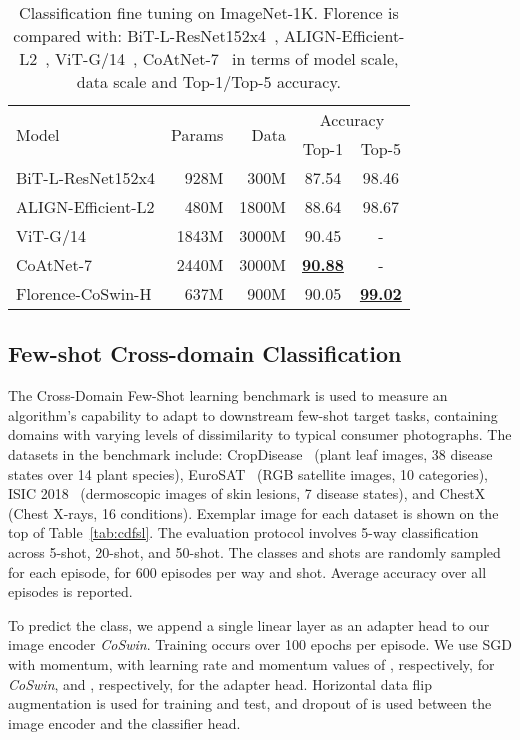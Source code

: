 \documentclass{article}
\begin{document}
\begin{table}[t]
\centering
\setlength{\tabcolsep}{6.3pt}
\small
\renewcommand{\arraystretch}{1.35}
\begin{tabular}{l|rrcc}
\toprule
\multirow{2}{*}{Model} & \multirow{2}{*}{Params} & \multirow{2}{*}{Data\;} &
\multicolumn{2}{c}{Accuracy} \\
& & & Top-1 & Top-5\\ \midrule
BiT-L-ResNet152x4 & 928M & 300M & 87.54 & 98.46  \\
ALIGN-Efficient-L2 & 480M & 1800M & 88.64 & 98.67  \\
ViT-G/14 & 1843M & 3000M & 90.45 & -  \\
CoAtNet-7 & 2440M & 3000M & \underline{\bf{90.88}} & - \\
Florence-CoSwin-H & 637M & 900M & 90.05 & \underline{\bf{99.02}}  \\ \bottomrule
\end{tabular}
\caption{Classification fine tuning on ImageNet-1K. Florence is compared with: BiT-L-ResNet152x4~\cite{kolesnikov2020big}, ALIGN-Efficient-L2~\cite{jia2021scaling}, ViT-G/14~\cite{zhai2021scaling}, CoAtNet-7~\cite{dai2021coatnet} in terms of model scale, data scale and Top-1/Top-5 accuracy.}
\label{tab:imagenet_result}
\end{table}


\subsection{Few-shot Cross-domain Classification}

The Cross-Domain Few-Shot learning benchmark \cite{cdfsl} is used to measure an algorithm's capability to adapt to downstream few-shot target tasks, containing domains with varying levels of dissimilarity to typical consumer photographs. The datasets in the benchmark include: CropDisease~\cite{plantdisease} (plant leaf images, 38 disease states over 14 plant species), EuroSAT~\cite{eurosat} (RGB satellite images, 10 categories), ISIC 2018~\cite{isic2018,ham10000} (dermoscopic images of skin lesions, 7 disease states), and ChestX~\cite{chestx} (Chest X-rays, 16 conditions). Exemplar image for each dataset is shown on the top of Table~\ref{tab:cdfsl}. The evaluation protocol involves 5-way classification across 5-shot, 20-shot, and 50-shot. The classes and shots are randomly sampled for each episode, for 600 episodes per way and shot. Average accuracy over all episodes is reported.

To predict the class, we append a single linear layer as an adapter head to our image encoder \emph{CoSwin}. Training occurs over 100 epochs per episode. We use SGD with momentum, with learning rate and momentum values of , respectively, for \emph{CoSwin}, and , respectively, for the adapter head. Horizontal data flip augmentation is used for training and test, and dropout of  is used between the image encoder and the classifier head.
\end{document}

